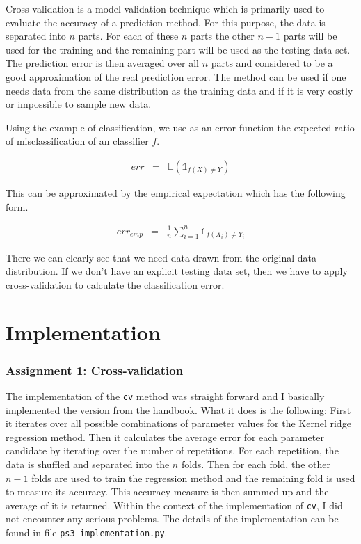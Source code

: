 \documentclass[a4paper, 11pt, titlepage]{article}
\begin{document}
Cross-validation is a model validation technique which is primarily used to evaluate the accuracy of a prediction method.
For this purpose, the data is separated into $n$ parts.
For each of these $n$ parts the other $n-1$ parts will be used for the training and the remaining part will be used as the testing data set.
The prediction error is then averaged over all $n$ parts and considered to be a good approximation of the real prediction error.
The method can be used if one needs data from the same distribution as the training data and if it is very costly or impossible to sample new data.

Using the example of classification, we use as an error function the expected ratio of misclassification of an classifier $f$.

\begin{eqnarray*}
	err &=& \mathbb{E}\left(\mathds{1}_{f(X) \not = Y}\right)
\end{eqnarray*}

This can be approximated by the empirical expectation which has the following form.

\begin{eqnarray*}
	err_{emp} &=& \frac{1}{n} \sum_{i=1}^n \mathds{1}_{f(X_i) \not = Y_i}
\end{eqnarray*}

There we can clearly see that we need data drawn from the original data distribution.
If we don't have an explicit testing data set, then we have to apply cross-validation to calculate the classification error.


\part{Implementation}
\label{part:implementation}

\section*{Assignment 1: Cross-validation}

The implementation of the \texttt{cv} method was straight forward and I basically implemented the version from the handbook.
What it does is the following:
First it iterates over all possible combinations of parameter values for the Kernel ridge regression method.
Then it calculates the average error for each parameter candidate by iterating over the number of repetitions.
For each repetition, the data is shuffled and separated into the $n$ folds.
Then for each fold, the other $n-1$ folds are used to train the regression method and the remaining fold is used to measure its accuracy.
This accuracy measure is then summed up and the average of it is returned.
Within the context of the implementation of \texttt{cv}, I did not encounter any serious problems.
The details of the implementation can be found in file \texttt{ps3\_implementation.py}.
\end{document}

